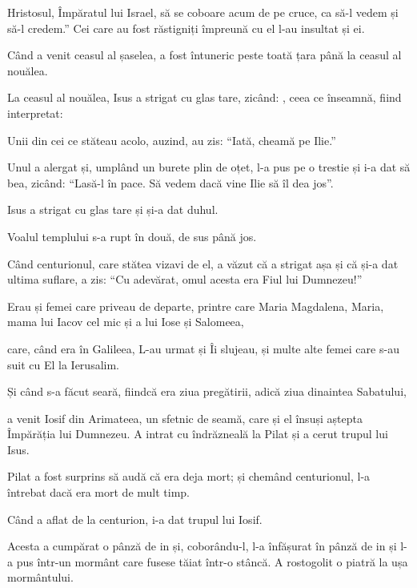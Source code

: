 {Hristosul, Împăratul lui Israel, să se coboare acum de pe cruce, ca să-l vedem și să-l credem.” Cei care au fost răstigniți împreună cu el l-au insultat și ei.


\par }{\PP {}Când a venit ceasul al șaselea, a fost întuneric peste toată țara până la ceasul al nouălea.

La ceasul al nouălea, Isus a strigat cu glas tare, zicând:
{}, ceea ce înseamnă, fiind interpretat:
{}


\par }{\PP {}Unii din cei ce stăteau acolo, auzind, au zis: “Iată, cheamă pe Ilie.”


\par }{\PP {}Unul a alergat și, umplând un burete plin de oțet, l-a pus pe o trestie și i-a dat să bea, zicând: “Lasă-l în pace. Să vedem dacă vine Ilie să îl dea jos”.


\par }{\PP {}Isus a strigat cu glas tare și și-a dat duhul.

Voalul templului s-a rupt în două, de sus până jos.

Când centurionul, care stătea vizavi de el, a văzut că a strigat așa și că și-a dat ultima suflare, a zis: “Cu adevărat, omul acesta era Fiul lui Dumnezeu!”


\par }{\PP {}Erau și femei care priveau de departe, printre care Maria Magdalena, Maria, mama lui Iacov cel mic și a lui Iose și Salomeea,

care, când era în Galileea, L-au urmat și Îi slujeau, și multe alte femei care s-au suit cu El la Ierusalim.


\par }{\PP {}Și când s-a făcut seară, fiindcă era ziua pregătirii, adică ziua dinaintea Sabatului,

a venit Iosif din Arimateea, un sfetnic de seamă, care și el însuși aștepta Împărăția lui Dumnezeu. A intrat cu îndrăzneală la Pilat și a cerut trupul lui Isus.

Pilat a fost surprins să audă că era deja mort; și chemând centurionul, l-a întrebat dacă era mort de mult timp.

Când a aflat de la centurion, i-a dat trupul lui Iosif.

Acesta a cumpărat o pânză de in și, coborându-l, l-a înfășurat în pânză de in și l-a pus într-un mormânt care fusese tăiat într-o stâncă. A rostogolit o piatră la ușa mormântului.

}
